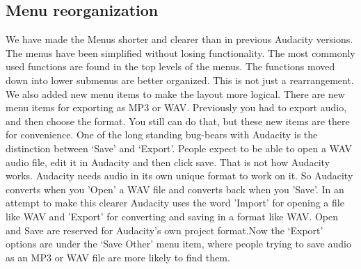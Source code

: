 \begin{multicols}{2}
\subsection{Menu reorganization}
\label{new:features:in:this:release:menus}We have made the Menus shorter and clearer than in previous Audacity versions. The menus have been simplified without losing functionality. The most commonly used functions are found in the top levels of the menus. The functions moved down into lower submenus are better organized.
This is not just a rearrangement.  We also added new menu items to make the layout more logical.  There are new menu items for exporting as MP3 or WAV. Previously you had to export audio, and then choose the format. You still can do that, but these new items are there for convenience.
One of the long standing bug-bears with Audacity is the distinction between ‘Save’ and ‘Export’. People expect to be able to open a WAV audio file, edit it in Audacity and then click save. That is not how Audacity works. Audacity needs audio in its own unique format to work on it. So Audacity converts when you 'Open' a WAV file and converts back when you 'Save'. In an attempt to make this clearer Audacity uses the word 'Import' for opening a file like WAV and 'Export' for converting and saving in a format like WAV. Open and Save are reserved for Audacity's own project format.Now the ‘Export’ options are under the ‘Save Other’ menu item, where people trying to save audio as an MP3 or WAV file are more likely to find them.

\end{multicols}
